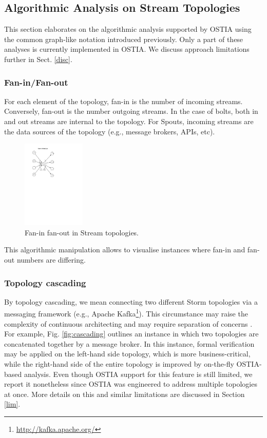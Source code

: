 \subsection{Algorithmic Analysis on Stream Topologies}\label{algo}

This section elaborates on the algorithmic analysis supported by OSTIA using the common graph-like notation introduced previously. Only a part of these analyses is currently implemented in OSTIA. We discuss approach limitations further in Sect. \ref{disc}.

\subsubsection{Fan-in/Fan-out}

For each element of the topology, fan-in is the number of incoming
streams. Conversely, fan-out is the number outgoing streams. In the case of
bolts, both in and out streams are internal to the topology. For Spouts,
incoming streams are the data sources of the topology (e.g., message brokers,
APIs, etc).

\begin{figure}[H]
	\begin{center}
		\includegraphics[width=3cm]{images/fan-in-out}
		\caption{Fan-in fan-out in Stream topologies.}
		\label{fig:fan}
	\end{center}
\end{figure}

This algorithmic manipulation allows to visualise instances where fan-in and fan-out numbers are differing.

\subsubsection{Topology cascading}

By topology cascading, we mean connecting two different Storm topologies via a messaging framework (e.g., Apache Kafka\footnote{\url{http://kafka.apache.org/}}). This circumstance may raise the complexity of continuous architecting and may require separation of concerns \cite{soc}. For example, Fig. \ref{fig:cascading} outlines an instance in which two topologies are concatenated together by a message broker. In this instance, formal verification may be applied on the left-hand side topology, which is more business-critical, while the right-hand side of the entire topology is improved by on-the-fly OSTIA-based analysis. Even though OSTIA support for this feature is still limited, we report it nonetheless since OSTIA was engineered to address multiple topologies at once. More details on this and similar limitations are discussed in Section \ref{lim}.

